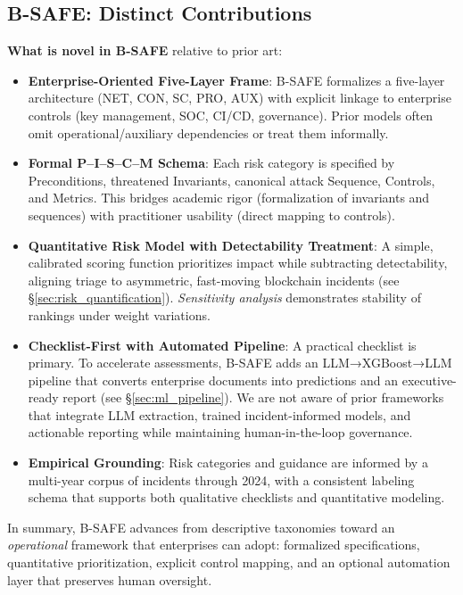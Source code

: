 \subsection*{B-SAFE: Distinct Contributions}
\textbf{What is novel in B-SAFE} relative to prior art:
\begin{itemize}
    \item \textbf{Enterprise-Oriented Five-Layer Frame}: B-SAFE formalizes a five-layer architecture (NET, CON, SC, PRO, AUX) with explicit linkage to enterprise controls (key management, SOC, CI/CD, governance). Prior models often omit operational/auxiliary dependencies or treat them informally.
    \item \textbf{Formal P–I–S–C–M Schema}: Each risk category is specified by Preconditions, threatened Invariants, canonical attack Sequence, Controls, and Metrics. This bridges academic rigor (formalization of invariants and sequences) with practitioner usability (direct mapping to controls).
    \item \textbf{Quantitative Risk Model with Detectability Treatment}: A simple, calibrated scoring function prioritizes impact while subtracting detectability, aligning triage to asymmetric, fast-moving blockchain incidents (see \S\ref{sec:risk_quantification}). \textit{Sensitivity analysis} demonstrates stability of rankings under weight variations.
    \item \textbf{Checklist-First with Automated Pipeline}: A practical checklist is primary. To accelerate assessments, B-SAFE adds an LLM→XGBoost→LLM pipeline that converts enterprise documents into predictions and an executive-ready report (see \S\ref{sec:ml_pipeline}). We are not aware of prior frameworks that integrate LLM extraction, trained incident-informed models, and actionable reporting while maintaining human-in-the-loop governance.
    \item \textbf{Empirical Grounding}: Risk categories and guidance are informed by a multi-year corpus of incidents through 2024, with a consistent labeling schema that supports both qualitative checklists and quantitative modeling.
\end{itemize}

In summary, B-SAFE advances from descriptive taxonomies toward an \textit{operational} framework that enterprises can adopt: formalized specifications, quantitative prioritization, explicit control mapping, and an optional automation layer that preserves human oversight.


